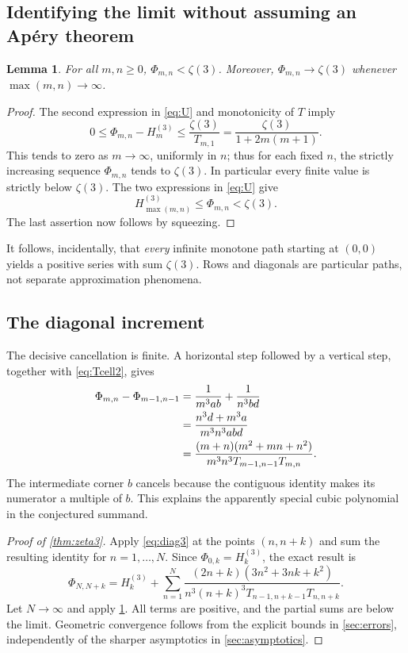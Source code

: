 \documentclass[11pt,letterpaper]{article}
\numberwithin{equation}{section}
\newtheorem{lemma}[theorem]{Lemma}
\theoremstyle{definition}
\newcommand{\Hh}[2]{H_{#1}^{(#2)}}
\newcommand{\zthree}{\zeta(3)}
\begin{document}
\subsection{Identifying the limit without assuming an Ap\'ery theorem}

\begin{lemma}\label{lem:Ulimit}
For all $m,n\geq0$, $\Phi_{m,n}<\zthree$. Moreover,
$\Phi_{m,n}\to\zthree$ whenever $\max(m,n)\to\infty$.
\end{lemma}
\begin{proof}
The second expression in \eqref{eq:U} and monotonicity of $T$ imply
\[
 0\leq \Phi_{m,n}-\Hh{m}{3}
 \leq\frac{\zthree}{T_{m,1}}
 =\frac{\zthree}{1+2m(m+1)}.
\]
This tends to zero as $m\to\infty$, uniformly in $n$; thus for each
fixed $n$, the strictly increasing sequence $\Phi_{m,n}$ tends to $\zthree$.
In particular every finite value is strictly below $\zthree$.
The two expressions in \eqref{eq:U} give
\[
 \Hh{\max(m,n)}{3}\leq \Phi_{m,n}<\zthree.
\]
The last assertion now follows by squeezing.
\end{proof}

It follows, incidentally, that \emph{every} infinite monotone path
starting at $(0,0)$ yields a positive series with sum $\zthree$.
Rows and diagonals are particular paths, not separate approximation
phenomena.

\subsection{The diagonal increment}

The decisive cancellation is finite. A horizontal step followed by a
vertical step, together with \eqref{eq:Tcell2}, gives
\begin{align}
 \Phi_{m,n}-\Phi_{m-1,n-1}
 &=\frac1{m^3ab}+\frac1{n^3bd}\notag\\
 &=\frac{n^3d+m^3a}{m^3n^3abd}\notag\\
 &=\frac{(m+n)(m^2+mn+n^2)}
 {m^3n^3T_{m-1,n-1}T_{m,n}}.\label{eq:diag3}
\end{align}
The intermediate corner $b$ cancels because the contiguous identity
makes its numerator a multiple of $b$. This explains the apparently
special cubic polynomial in the conjectured summand.

\begin{proof}[Proof of \cref{thm:zeta3}]
Apply \eqref{eq:diag3} at the points $(n,n+k)$ and sum the
resulting identity for $n=1,\ldots,N$.
Since $\Phi_{0,k}=\Hh{k}{3}$, the exact result is
\begin{equation}\label{eq:finite3}
 \Phi_{N,N+k}=\Hh{k}{3}+
 \sum_{n=1}^{N}
 \frac{(2n+k)(3n^2+3nk+k^2)}
 {n^3(n+k)^3T_{n-1,n+k-1}T_{n,n+k}}.
\end{equation}
Let $N\to\infty$ and apply \cref{lem:Ulimit}. All terms are positive,
and the partial sums are below the limit. Geometric convergence follows
from the explicit bounds in \cref{sec:errors}, independently of the
sharper asymptotics in \cref{sec:asymptotics}.
\end{proof}
\end{document}
